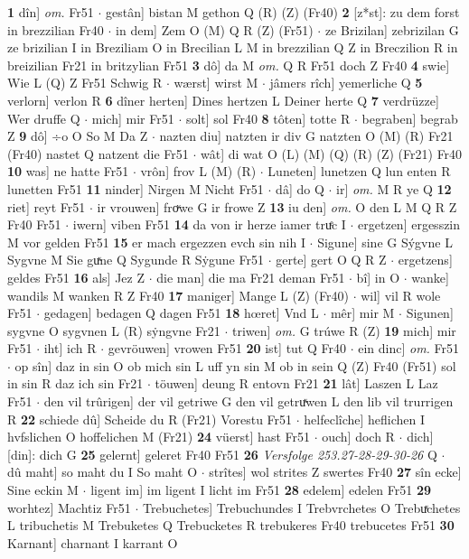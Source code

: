 \documentclass[8pt,a4paper,notitlepage]{article}
\begin{document}
\begin{table}[ht]
\begin{minipage}[t]{0.5\linewidth}
\textbf{1} dîn] \textit{om.} Fr51  $\cdot$ gestân] bistan M gethon Q (R) (Z) (Fr40) \textbf{2} [z*st]: zu dem forst in brezzilian Fr40  $\cdot$ in dem] Zem O (M) Q R (Z) (Fr51)  $\cdot$ ze Brizilan] zebrizilan G ze brizilian I in Breziliam O in Brecilian L M in brezzilian Q Z in Breczilion R in breizilian Fr21 in britzylian Fr51 \textbf{3} dô] da M \textit{om.} Q R Fr51 doch Z Fr40 \textbf{4} swie] Wie L (Q) Z Fr51 Schwig R  $\cdot$ wærst] wirst M  $\cdot$ jâmers rîch] yemerliche Q \textbf{5} verlorn] verlon R \textbf{6} dîner herten] Dines hertzen L Deiner herte Q \textbf{7} verdrüzze] Wer druffe Q  $\cdot$ mich] mir Fr51  $\cdot$ solt] sol Fr40 \textbf{8} tôten] totte R  $\cdot$ begraben] begrab Z \textbf{9} dô] ÷o O So M Da Z  $\cdot$ nazten diu] natzten ir div G natzten O (M) (R) Fr21 (Fr40) nastet Q natzent die Fr51  $\cdot$ wât] di wat O (L) (M) (Q) (R) (Z) (Fr21) Fr40 \textbf{10} was] ne hatte Fr51  $\cdot$ vrôn] frov L (M) (R)  $\cdot$ Luneten] lunetzen Q lun enten R lunetten Fr51 \textbf{11} ninder] Nirgen M Nicht Fr51  $\cdot$ dâ] do Q  $\cdot$ ir] \textit{om.} M R ye Q \textbf{12} riet] reyt Fr51  $\cdot$ ir vrouwen] froͮwe G ir frowe Z \textbf{13} iu den] \textit{om.} O den L M Q R Z Fr40 Fr51  $\cdot$ iwern] viben Fr51 \textbf{14} da von ir herze iamer truͤc I  $\cdot$ ergetzen] ergesszin M vor gelden Fr51 \textbf{15} er mach ergezzen evch sin nih I  $\cdot$ Sigune] sine G Sýgvne L Sygvne M Sie guͯne Q Sygunde R Sẏgune Fr51  $\cdot$ gerte] gert O Q R Z  $\cdot$ ergetzens] geldes Fr51 \textbf{16} als] Jez Z  $\cdot$ die man] die ma Fr21 deman Fr51  $\cdot$ bî] in O  $\cdot$ wanke] wandils M wanken R Z Fr40 \textbf{17} maniger] Mange L (Z) (Fr40)  $\cdot$ wil] vil R wole Fr51  $\cdot$ gedagen] bedagen Q dagen Fr51 \textbf{18} hœret] Vnd L  $\cdot$ mêr] mir M  $\cdot$ Sigunen] sygvne O sygvnen L (R) sẏngvne Fr21  $\cdot$ triwen] \textit{om.} G trúwe R (Z) \textbf{19} mich] mir Fr51  $\cdot$ iht] ich R  $\cdot$ gevröuwen] vrowen Fr51 \textbf{20} ist] tut Q Fr40  $\cdot$ ein dinc] \textit{om.} Fr51  $\cdot$ op sîn] daz in sin O ob mich sin L uff yn sin M ob in sein Q (Z) Fr40 (Fr51) sol in sin R daz ich sin Fr21  $\cdot$ töuwen] deung R entovn Fr21 \textbf{21} lât] Laszen L Laz Fr51  $\cdot$ den vil trûrigen] der vil getriwe G den vil getruͯwen L den lib vil trurrigen R \textbf{22} schiede dû] Scheide du R (Fr21) Vorestu Fr51  $\cdot$ helfeclîche] heflichen I hvfslichen O hoffelichen M (Fr21) \textbf{24} vüerst] hast Fr51  $\cdot$ ouch] doch R  $\cdot$ dich] [din]: dich G \textbf{25} gelernt] geleret Fr40 Fr51 \textbf{26} \textit{Versfolge 253.27-28-29-30-26} Q   $\cdot$ dû maht] so maht du I So maht O  $\cdot$ strîtes] wol strites Z swertes Fr40 \textbf{27} sîn ecke] Sine eckin M  $\cdot$ ligent im] im ligent I licht im Fr51 \textbf{28} edelem] edelen Fr51 \textbf{29} worhtez] Machtiz Fr51  $\cdot$ Trebuchetes] Trebuchundes I Trebvrchetes O Trebuͯchetes L tribuchetis M Trebuketes Q Trebucketes R trebukeres Fr40 trebucetes Fr51 \textbf{30} Karnant] charnant I karrant O \newline

\end{minipage}
\end{table}
\end{document}
